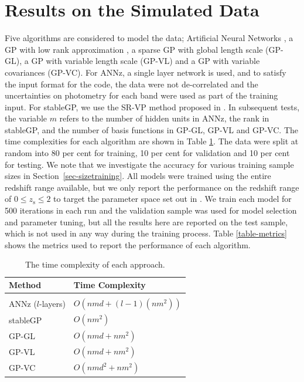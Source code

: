\documentclass[useAMS,usenatbib,fleqn]{mn2e}
\begin{document}
\section{Results on the Simulated Data}
\label{sec-experiments}

Five algorithms are considered to model the data; Artificial Neural Networks \citep[{\sc ANNz};][]{Collister04}, a GP with low rank approximation \citep[{\sc stableGP};][]{foster2009}, a sparse GP with global length scale (GP-GL), a GP with variable length scale (GP-VL) and a GP with variable covariances (GP-VC). For {\sc ANNz}, a single layer network is used, and to satisfy the input format for the code, the data were not de-correlated and the uncertainties on photometry for each band were used as part of the training input. For {\sc stableGP}, we use the SR-VP method proposed in \citet{foster2009}. In subsequent tests, the variable $m$ refers to the number of hidden units in {\sc ANNz}, the rank in {\sc stableGP}, and the number of basis functions in GP-GL, GP-VL and GP-VC. The time complexities for each algorithm are shown in Table \ref{table-time-complexity}. The data were split at random into 80 per cent for training, 10 per cent for validation and 10 per cent for testing. We note that we investigate the accuracy for various training sample sizes in Section~\ref{sec-sizetraining}. All models were trained using the entire redshift range available, but we only report the performance on the redshift range of $0 \le z_\textrm{s} \le 2$ to target the parameter space set out in \cite{laureijs2011}. We train each model for 500 iterations in each run and the validation sample was used for model selection and parameter tuning, but all the results here are reported on the test sample, which is not used in any way during the training process. Table \ref{table-metrics} shows the metrics used to report the performance of each algorithm.

\begin{table}
\caption{The time complexity of each approach.}
\begin{center}
  \begin{tabular}{| l | l |}
     	Method		&	Time Complexity					\\	\hline				\\
	{\sc ANNz} ($l$-layers)			&	$O\left(nmd+(l-1)(nm^{2})\right)$					\\
	{\sc stableGP}		&	$O\left(nm^{2}\right)$				\\
	GP-GL		&	$O\left(nmd+nm^{2}\right)$		\\	
	GP-VL		&	$O\left(nmd+nm^{2}\right)$		\\	
	GP-VC		&	$O\left(nmd^{2}+nm^{2}\right)$	\\	\hline
  \end{tabular}
\end{center}
\label{table-time-complexity}
\end{table}
\end{document}
